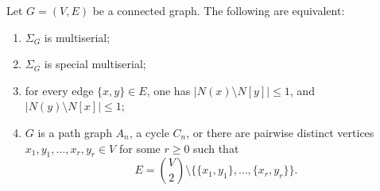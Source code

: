 \documentclass[a4paper,leqno]{amsart}
\begin{document}
\begin{prop}\label{prop:multiserial}
Let $G=(V,E)$ be a connected graph. The following are equivalent:
\begin{enumerate}
\item $\Sigma_G$ is multiserial;
\item $\Sigma_G$ is special multiserial;
\item for every edge $\{x,y\}\in E$, one has
$\left|N(x)\setminus N[y]\right|\leq1$, and $\left|N(y)\setminus N[x]\right|\leq1$;
\item $G$ is a path graph $A_n$, a cycle $C_n$, or there are pairwise distinct vertices $x_1,y_1,\ldots,x_r,y_r\in V$ for some $r\geq0$ such that
$$E=\binom{V}{2}\setminus
\bigl\{\{x_1,y_1\},\ldots,\{x_r,y_r\}\bigr\}.$$
\end{enumerate}
\end{prop}
\end{document}
